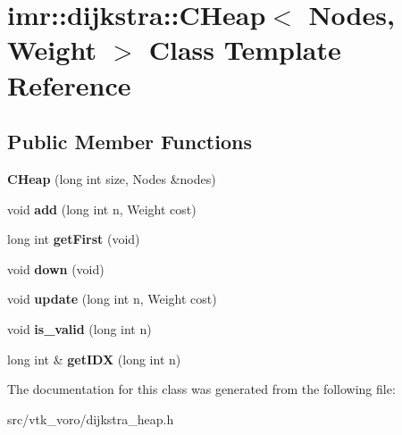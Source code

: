 \hypertarget{classimr_1_1dijkstra_1_1CHeap}{}\section{imr\+:\+:dijkstra\+:\+:C\+Heap$<$ Nodes, Weight $>$ Class Template Reference}
\label{classimr_1_1dijkstra_1_1CHeap}
\subsection*{Public Member Functions}
\begin{DoxyCompactItemize}
\item 
{\bfseries C\+Heap} (long int size, Nodes \&nodes)\hypertarget{classimr_1_1dijkstra_1_1CHeap_a0dcc6e82a4e647a83ed243056802db47}{}\label{classimr_1_1dijkstra_1_1CHeap_a0dcc6e82a4e647a83ed243056802db47}

\item 
void {\bfseries add} (long int n, Weight cost)\hypertarget{classimr_1_1dijkstra_1_1CHeap_a7933d0f3562eae91203f8d13c3787727}{}\label{classimr_1_1dijkstra_1_1CHeap_a7933d0f3562eae91203f8d13c3787727}

\item 
long int {\bfseries get\+First} (void)\hypertarget{classimr_1_1dijkstra_1_1CHeap_aa3119e144f875edcbdbfc2d6819c0843}{}\label{classimr_1_1dijkstra_1_1CHeap_aa3119e144f875edcbdbfc2d6819c0843}

\item 
void {\bfseries down} (void)\hypertarget{classimr_1_1dijkstra_1_1CHeap_ad5d61352e68fb079ecf46196a7de9bc2}{}\label{classimr_1_1dijkstra_1_1CHeap_ad5d61352e68fb079ecf46196a7de9bc2}

\item 
void {\bfseries update} (long int n, Weight cost)\hypertarget{classimr_1_1dijkstra_1_1CHeap_a5fb736f0839c96f7b0b280d771d126fa}{}\label{classimr_1_1dijkstra_1_1CHeap_a5fb736f0839c96f7b0b280d771d126fa}

\item 
void {\bfseries is\+\_\+valid} (long int n)\hypertarget{classimr_1_1dijkstra_1_1CHeap_a0fa4954bb595dfffd8cf2cd734b0045d}{}\label{classimr_1_1dijkstra_1_1CHeap_a0fa4954bb595dfffd8cf2cd734b0045d}

\item 
long int \& {\bfseries get\+I\+DX} (long int n)\hypertarget{classimr_1_1dijkstra_1_1CHeap_a0d0d043ee5e1b20fb0dc692f8c67e746}{}\label{classimr_1_1dijkstra_1_1CHeap_a0d0d043ee5e1b20fb0dc692f8c67e746}

\end{DoxyCompactItemize}


The documentation for this class was generated from the following file\+:\begin{DoxyCompactItemize}
\item 
src/vtk\+\_\+voro/dijkstra\+\_\+heap.\+h\end{DoxyCompactItemize}
